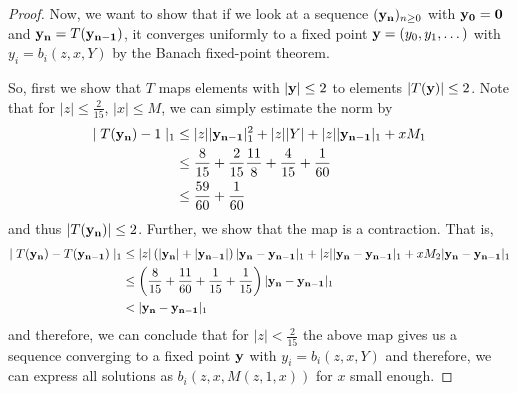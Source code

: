 \documentclass[reqno, 11pt]{amsart}
\theoremstyle{definition}
\theoremstyle{remark}
\numberwithin{equation}{section}
\begin{document}
\begin{proof}
    Now, we want to show that if we look at a sequence $({\bf y_n})_{n\geq 0}$ with $\bf y_0 = 0$ and ${\bf y_n} = T({\bf y_{n-1}})$, it converges uniformly to a fixed point ${\bf y} = (y_0,y_1,\dots)$ with $y_i = b_i(z,x,Y)$ by the Banach fixed-point theorem.

    So, first we show that $T$ maps elements with $|{\bf y}| \leq 2$ to elements $|T({\bf y})| \leq 2$. Note that for $|z|\leq \frac{2}{15}$, $|x|\leq M$, we can simply estimate the norm by
    \begin{align*}
        \mid T({\bf y_n})-1\mid_1  &\leq |z| |{\bf y_{n-1}}|_1^2+|z||Y| + |z||{\bf y_{n-1}}|_1 + xM_1 \\
        &\leq \frac{8}{15}+\frac{2}{15}\frac{11}{8}+\frac{4}{15}+\frac{1}{60} \\ &\leq \frac{59}{60}+\frac{1}{60} 
    \end{align*}
    and thus $|T({\bf y_n})| \leq 2$. Further, we show that the map is a contraction. That is, 
    \begin{align*}
        \mid T({\bf y_n})-T({\bf y_{n-1}})\mid_1  &\leq |z|\left(|\bf {y_n}|+|{\bf y_{n-1}}|\right) |{\bf y_{n}}-{\bf y_{n-1}}|_1 + |z||{\bf y_n}-{\bf y_{n-1}}|_1 + xM_2|{\bf y_n}-{\bf y_{n-1}}|_1 \\
        &\leq \left(\frac{8}{15}+\frac{11}{60}+\frac{1}{15}+\frac{1}{15}\right) |{\bf y_n}-{\bf y_{n-1}}|_1\\
        &<|{\bf y_n}-{\bf y_{n-1}}|_1
    \end{align*}
    and therefore, we can conclude that for $|z|<\frac{2}{15}$ the above map gives us a sequence converging to a fixed point $\bf y$ with $y_i=b_i(z,x,Y)$ and therefore, we can express all solutions as $b_i(z,x,M(z,1,x))$ for $x$ small enough.
\end{proof}
\end{document}
